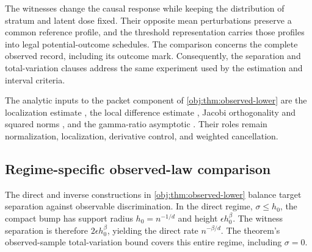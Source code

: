 
The witnesses change the causal response while keeping the distribution of stratum and latent dose fixed. Their opposite mean perturbations preserve a common reference profile, and the threshold representation carries those profiles into legal potential-outcome schedules. The comparison concerns the complete observed record, including its outcome mark. Consequently, the separation and total-variation clauses address the same experiment used by the estimation and interval criteria.

The analytic inputs to the packet component of \cref{obj:thm:observed-lower} are the localization estimate \citep[Theorem 2.4, equation (2.14)]{PetrushevXu2005}, the local difference estimate \citep[Theorem 2.2, equation (2.4)]{https://people.math.sc.edu/pencho/Publications/kpx-06-28-06-web.pdf}, Jacobi orthogonality and squared norms \citep[Table 18.3.1, Jacobi row and caption]{https://dlmf.nist.gov/18.3}, and the gamma-ratio asymptotic \citep[equation (5.11.12), positive real axis]{https://dlmf.nist.gov/5.11.E12}. Their roles remain normalization, localization, derivative control, and weighted cancellation.

\subsection{Regime-specific observed-law comparison}

The direct and inverse constructions in \cref{obj:thm:observed-lower} balance target separation against observable discrimination. In the direct regime, \(\sigma\le h_0\), the compact bump has support radius \(h_0=n^{-1/d}\) and height \(\epsilon h_0^\beta\). The witness separation is therefore \(2\epsilon h_0^\beta\), yielding the direct rate \(n^{-\beta/d}\). The theorem's observed-sample total-variation bound covers this entire regime, including \(\sigma=0\).

